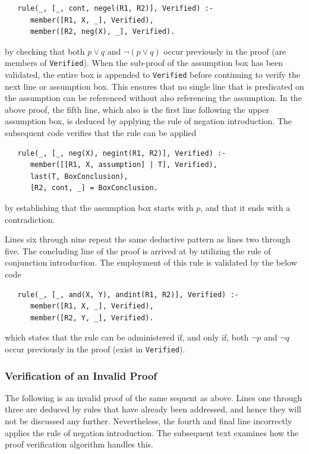 \documentclass[a4paper, 11pt]{article}
\begin{document}
\begin{verbatim}
   rule(_, [_, cont, negel(R1, R2)], Verified) :-
      member([R1, X, _], Verified),
      member([R2, neg(X), _], Verified).
\end{verbatim}

   by checking that both $p \vee q$ and 
   $\neg(p \vee q)$ occur previously in the proof
   (are members of \texttt{Verified}). When the
   sub-proof of the assumption box has been
   validated, the entire box is appended to
   \texttt{Verified} before continuing to verify the
   next line or assumption box. This ensures that no
   single line that is predicated on the assumption
   can be referenced without also referencing the
   assumption. In the above proof, the fifth line, 
   which also is the first line following the
   upper assumption box, is deduced by applying the
   rule of negation introduction. The subsequent code
   verifies that the rule can be applied

\begin{verbatim}
   rule(_, [_, neg(X), negint(R1, R2)], Verified) :-
      member([[R1, X, assumption] | T], Verified),
      last(T, BoxConclusion),
      [R2, cont, _] = BoxConclusion.
\end{verbatim}

   by establishing that the assumption box starts
   with $p$, and that it ends with a contradiction.
   \bigbreak

   Lines six through nine repeat the 
   same deductive pattern as lines two through five.
   The concluding line of the proof is arrived at by
   utilizing the rule of conjunction introduction.
   The employment of this rule is validated by the
   below code

\begin{verbatim}
   rule(_, [_, and(X, Y), andint(R1, R2)], Verified) :-
      member([R1, X, _], Verified),
      member([R2, Y, _], Verified).
\end{verbatim}

   which states that the rule can be administered if,
   and only if, both $\neg p$ and $\neg q$ occur
   previously in the proof (exist in
   \texttt{Verified}).

   \subsubsection{Verification of an Invalid Proof}
   
   The following is an invalid proof of the same sequent as
   above. Lines one through three are deduced by rules that 
   have already been addressed, and hence they will not be 
   discussed any further. Nevertheless, the fourth and final 
   line incorrectly applies the rule of negation introduction.
   The subsequent text examines how the proof verification 
   algorithm handles this.
\end{document}
